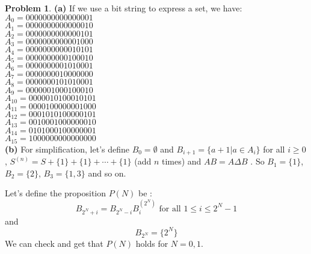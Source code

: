 \documentclass[12pt]{article}
\theoremstyle{definition}
\newtheorem{hw}{Problem}
\begin{document}
	\begin{hw}
		\textbf{(a)} If we use a bit string to express a set, we have: \\
			$A_{0} = 0000000000000001$ \\
			$A_{1} = 0000000000000010$ \\
			$A_{2} = 0000000000000101$ \\
			$A_{3} = 0000000000001000$ \\
			$A_{4} = 0000000000010101$ \\
			$A_{5} = 0000000000100010$ \\
			$A_{6} = 0000000001010001$ \\
			$A_{7} = 0000000010000000$ \\
			$A_{8} = 0000000101010001$ \\
			$A_{9} = 0000001000100010$ \\
			$A_{10} = 0000010100010101$ \\
			$A_{11} = 0000100000001000$ \\
			$A_{12} = 0001010100000101$ \\
			$A_{13} = 0010001000000010$ \\
			$A_{14} = 0101000100000001$ \\
			$A_{15} = 1000000000000000$ \\

		\textbf{(b)}
		For simplification, let's define $B_0 = \emptyset$ and $B_{i+1} = \{a + 1 \vert a \in A_i\}$ for all $i \geq 0$, $S^{(n)} = S + \{1\} + \{1\} + \cdots + \{1\}$ (add $n$ times) and $AB = A\Delta B$ . So $B_1 = \{1\}$, $B_2 = \{2\}$, $B_3 = \{ 1, 3\}$ and so on. 
		
		Let's define the proposition $P(N)$ be :
		$$
			B_{2^N+i} = B_{2^N-i}B_i^{(2^N)} \text{ for all } 1 \leq i \leq 2^N - 1
		$$ and $$
			B_{2^N} = \{2^N\}
		$$
		We can check and get that $P(N)$ holds for $N = 0, 1$.
		

\end{hw}
\end{document}

